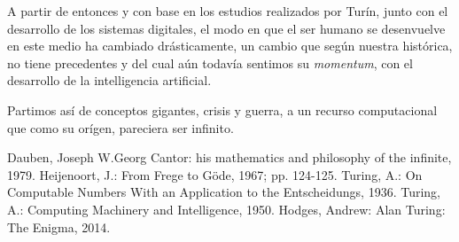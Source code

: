 \documentclass[12pt,a4paper]{report}
\begin{document}
        A partir de entonces y con base en los estudios realizados por Turín, junto con el desarrollo de los sistemas digitales, el modo en que el ser humano se desenvuelve en este medio ha cambiado drásticamente, un cambio que según nuestra histórica, no tiene precedentes y del cual aún todavía sentimos su \textit{momentum}, con el desarrollo de la intelligencia artificial.
        
    \vspace{1cm}
        Partimos así de conceptos gigantes, crisis y guerra, a un recurso computacional que como su orígen, pareciera ser infinito.
        

\begin{thebibliography}{0}



   Dauben, Joseph W.Georg Cantor: his mathematics and philosophy of the infinite, 1979.
   Heijenoort, J.: From Frege to Göde, 1967; pp. 124-125.
   Turing, A.: On Computable Numbers With an Application to the Entscheidungs, 1936.
  Turing, A.: Computing Machinery and Intelligence, 1950.
  Hodges, Andrew: Alan Turing: The Enigma, 2014.
\end{thebibliography}
\end{document}
